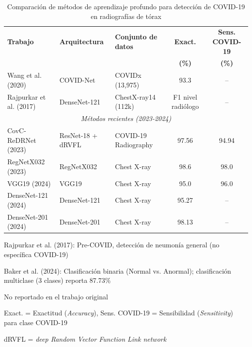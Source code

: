 
\begin{table}[htbp]
\centering
\begin{threeparttable}
\caption{Comparación de métodos de aprendizaje profundo para detección de COVID-19 en radiografías de tórax}
\label{tab:covid19_detection_comparison}
\small
\setlength{\tabcolsep}{2.5pt}
\begin{tabular}{@{}p{3.0cm}p{2.8cm}p{3.4cm}cc@{}}
\toprule
\textbf{Trabajo} & \textbf{Arquitectura} & \textbf{Conjunto de datos} & \textbf{Exact.} & \textbf{Sens. COVID-19} \\
 & & & \textbf{(\%)} & \textbf{(\%)} \\
\midrule
Wang et al. (2020) \cite{wang2020covidnet} & COVID-Net & COVIDx (13,975) & 93.3 & -- \\
Rajpurkar et al. (2017)\tnote{a} & DenseNet-121 & ChestX-ray14 (112k) & F1 nivel radiólogo & -- \\
\midrule
\multicolumn{5}{c}{\textit{Métodos recientes (2023-2024)}} \\
\midrule
CovC-ReDRNet (2023) \cite{zhu2023covc} & ResNet-18 + dRVFL & COVID-19 Radiography & 97.56 & 94.94 \\
RegNetX032 (2023) \cite{chetoui2023regnet} & RegNetX032 & Chest X-ray & 98.6 & 98.0 \\
VGG19 (2024) \cite{elhouby2024vgg19} & VGG19 & Chest X-ray & 95.0 & 96.0 \\
DenseNet-121 (2024) \cite{dalvi2024densenet121} & DenseNet-121 & Chest X-ray & 95.27 & -- \\
DenseNet-201 (2024) \cite{baker2024densenet201} & DenseNet-201 & Chest X-ray & 98.13\tnote{b} & -- \\
\midrule
\bottomrule
\end{tabular}
\begin{tablenotes}
\footnotesize
\item[a] Rajpurkar et al. (2017): Pre-COVID, detección de neumonía general (no específica COVID-19)
\item[b] Baker et al. (2024): Clasificación binaria (Normal vs. Anormal); clasificación multiclase (3 clases) reporta 87.73\%
\item[--] No reportado en el trabajo original
\item Exact. = Exactitud (\textit{Accuracy}), Sens. COVID-19 = Sensibilidad (\textit{Sensitivity}) para clase COVID-19
\item dRVFL = \textit{deep Random Vector Function Link network}
\end{tablenotes}
\end{threeparttable}
\end{table}
